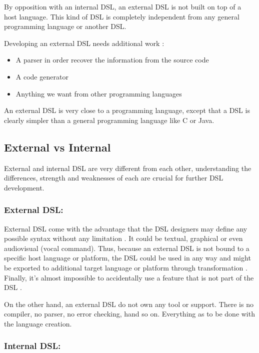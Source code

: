 By opposition with an internal \gls{DSL}, an external \gls{DSL} is not built on
top of a host language. This kind of \gls{DSL} is completely independent from
any general programming language or another \gls{DSL}.

Developing an external \gls{DSL} needs additional work :
\begin{itemize}
\item A parser in order recover the information from the source code
\item A code generator
\item Anything we want from other programming languages
\end{itemize}

An external \gls{DSL} is very close to a programming language, except that a
\gls{DSL} is clearly simpler than a general programming language like C or Java.

\subsection{External vs Internal}
\label{sec:external_vs_internal}

External and internal \gls{DSL} are very different from each other,
understanding the differences, strength and weaknesses of each are crucial for
further \gls{DSL} development.

\subsubsection{External \gls{DSL}:}


External \gls{DSL} come with the advantage that the \gls{DSL} designers may
define any possible syntax without any limitation \cite{Strembeck2009}. It could be textual,
graphical or even audiovisual (vocal command). Thus, because an external
\gls{DSL} is not bound to a specific host language or platform, the \gls{DSL}
could be used in any way and might be exported to additional target language or
platform through transformation \cite{strembeckmarkzdunuwe2009}. Finally, it’s
almost impossible to accidentally use a feature that is not part of the \gls{DSL}
\cite{strembeckmarkzdunuwe2009}.

On the other hand, an external \gls{DSL} do not own any tool or support. There
is no compiler, no parser, no error checking, hand so on. Everything as to be done
with the language creation.

\subsubsection{Internal \gls{DSL}:}

